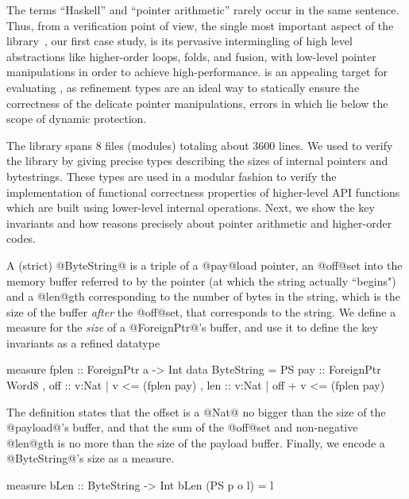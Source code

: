 The terms ``Haskell'' and ``pointer arithmetic'' 
rarely occur in the same sentence. 
Thus, from a verification point of view, the 
single most important aspect of the \bytestring 
library~\cite{bytestring}, our first
case study, is its pervasive intermingling of
high level abstractions like higher-order loops,
folds, and fusion, with low-level pointer 
manipulations in order to achieve high-performance. 
%
%
\bytestring is an appealing target for evaluating
\toolname, as refinement types are an ideal way to 
statically ensure the correctness of the delicate 
pointer manipulations, errors in which lie below 
the scope of dynamic protection.

The library spans $8$ files (modules) totaling about 3600 lines.
We used \toolname to verify the library by giving precise 
types describing the sizes of internal pointers and bytestrings. 
These types are used in a modular fashion to verify the 
implementation of functional correctness properties of 
higher-level API functions which are built using 
lower-level internal operations. 
Next, we show the key invariants and how
\toolname reasons precisely about pointer
arithmetic and higher-order codes.

A (strict) @ByteString@ is a triple of a @pay@load pointer, 
an @off@set into the memory buffer referred to by the pointer 
(at which the string actually ``begins") and a @len@gth 
corresponding to the number of bytes in the string, which is 
the size of the buffer \emph{after} the @off@set, that
corresponds to the string.
%
We define a measure for the \emph{size} of 
a @ForeignPtr@'s buffer, and use it to define 
the key invariants as a refined datatype 
%
\begin{code}
measure fplen  :: ForeignPtr a -> Int
data ByteString = PS
 { pay :: ForeignPtr Word8
 , off :: {v:Nat | v       <= (fplen pay)}
 , len :: {v:Nat | off + v <= (fplen pay)} }
\end{code}
%
The definition states that 
the offset is a @Nat@ no bigger than the size of 
the @payload@'s buffer, and that
the sum of the @off@set and non-negative @len@gth
is no more than the size of the payload buffer.
Finally, we encode a @ByteString@'s size as a measure.
%
\begin{code}
measure bLen   :: ByteString -> Int
bLen (PS p o l) = l
\end{code}

